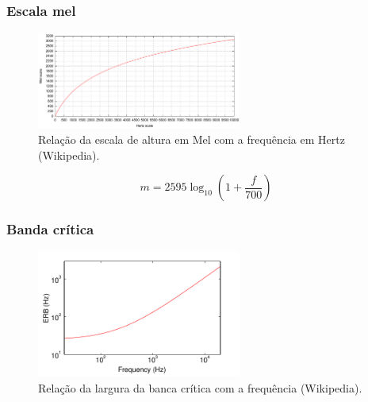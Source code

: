 \begin{frame}[allowframebreaks]
  \frametitle{Escala mel}
  \begin{figure}[h]
  \centering
  \includegraphics[width=0.6\textwidth]{images/melscale.pdf}
  \caption{Relação da escala de altura em Mel com a frequência em Hertz (Wikipedia).}
  \label{fig-mel-scale}
  \end{figure}

  \begin{equation}
  m = 2595 \log_{10}\left(1 + \frac{f}{700}\right)
  \end{equation}
\end{frame}

\begin{frame}[allowframebreaks]
  \frametitle{Banda crítica}
  \begin{figure}[h]
  \centering
  \includegraphics[width=0.6\textwidth]{images/criticalband.pdf}
  \caption{Relação da largura da banca crítica com a frequência (Wikipedia).}
  \label{fig-critical-band}
  \end{figure}
\end{frame}


